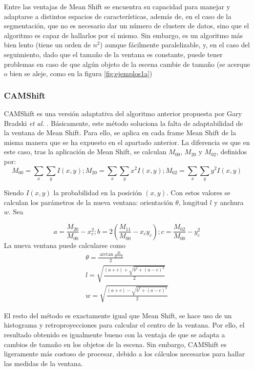 Entre las ventajas de Mean Shift se encuentra su capacidad para manejar y adaptarse a distintos espacios de características, además de, en el caso de la segmentación, que no es necesario dar un número de clusters de datos, sino que el algoritmo es capaz de hallarlos por sí mismo. Sin embargo, es un algoritmo más bien lento (tiene un orden de $n^2$) aunque fácilmente paralelizable, y, en el caso del seguimiento, dado que el tamaño de la ventana es constante, puede tener problemas en caso de que algún objeto de la escena cambie de tamaño (se acerque o bien se aleje, como en la figura \ref{fig:ejemplos1a})

\subsubsection*{CAMShift}

CAMShift es una versión adaptativa del algoritmo anterior propuesta por Gary Bradski \textit{et al.} \cite{art:camshift}. Básicamente, este método soluciona la falta de adaptabilidad de la ventana de Mean Shift. Para ello, se aplica en cada frame Mean Shift de la misma manera que se ha expuesto en el apartado anterior. La diferencia es que en este caso, tras la aplicación de Mean Shift, se calculan $M_{00}$, $M_{20}$ y $M_{02}$, definidos por:
\[
  M_{00} = \sum_x \sum_y I(x,y) ; M_{20} = \sum_x \sum_y x^2 I(x,y) ; M_{02} = \sum_x \sum_y y^2 I(x,y)
\]

Siendo $I(x,y)$ la probabilidad en la posición $(x,y)$. Con estos valores se calculan los parámetros de la nueva ventana: orientación $\theta$, longitud $l$ y anchura $w$. Sea

\[
a = \frac{M_{20}}{M_{00}} - x_c^2 ; b = 2(\frac{M_{11}}{M_00}-x_cy_c) ; c = \frac{M_{02}}{M_{00}} - y_c^2
\]
La nueva ventana puede calcularse como
\begin{gather*}
  \theta = \frac{\arctan \frac{2b}{a-c}}{2} \\
  l = \sqrt{\frac{(a+c)+\sqrt{b^2+(a-c)^2}}{2}} \\
  w = \sqrt{\frac{(a+c)-\sqrt{b^2+(a-c)^2}}{2}}
\end{gather*}

El resto del método es exactamente igual que Mean Shift, se hace uso de un histograma y retroproyecciones para calcular el centro de la ventana. Por ello, el resultado obtenido es igualmente bueno con la ventaja de que se adapta a cambios de tamaño en los objetos de la escena. Sin embargo, CAMShift es ligeramente más costoso de procesar, debido a los cálculos necesarios para hallar las medidas de la ventana.


